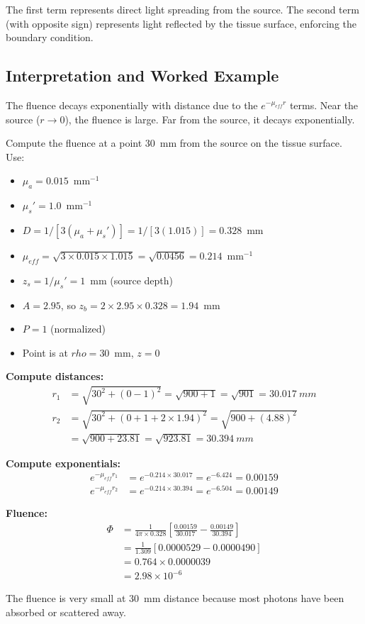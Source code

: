 \documentclass[12pt]{article}
\def\rho{rho}%
\def\mathrm#1{#1}%
\def\text#1{#1}%
\begin{document}
The first term represents direct light spreading from the source. The second term (with opposite sign) represents light reflected by the tissue surface, enforcing the boundary condition.

\subsection{Interpretation and Worked Example}

The fluence decays exponentially with distance due to the $e^{-\mu_{\mathrm{eff}} r}$ terms. Near the source ($r \to 0$), the fluence is large. Far from the source, it decays exponentially.

\begin{workexample}
Compute the fluence at a point 30~mm from the source on the tissue surface. Use:
\begin{itemize}
\item $\mu_a = 0.015$~mm$^{-1}$
\item $\mu_s' = 1.0$~mm$^{-1}$
\item $D = 1 / [3(\mu_a + \mu_s')] = 1 / [3(1.015)] = 0.328$~mm
\item $\mu_{\mathrm{eff}} = \sqrt{3 \times 0.015 \times 1.015} = \sqrt{0.0456} = 0.214$~mm$^{-1}$
\item $z_s = 1 / \mu_s' = 1$~mm (source depth)
\item $A = 2.95$, so $z_b = 2 \times 2.95 \times 0.328 = 1.94$~mm
\item $P = 1$ (normalized)
\item Point is at $\rho = 30$~mm, $z = 0$
\end{itemize}

\textbf{Compute distances:}
\begin{align}
r_1 &= \sqrt{30^2 + (0 - 1)^2} = \sqrt{900 + 1} = \sqrt{901} = 30.017~\text{mm} \\
r_2 &= \sqrt{30^2 + (0 + 1 + 2 \times 1.94)^2} = \sqrt{900 + (4.88)^2} \\
    &= \sqrt{900 + 23.81} = \sqrt{923.81} = 30.394~\text{mm}
\end{align}

\textbf{Compute exponentials:}
\begin{align}
e^{-\mu_{\mathrm{eff}} r_1} &= e^{-0.214 \times 30.017} = e^{-6.424} = 0.00159 \\
e^{-\mu_{\mathrm{eff}} r_2} &= e^{-0.214 \times 30.394} = e^{-6.504} = 0.00149
\end{align}

\textbf{Fluence:}
\begin{align}
\Phi &= \frac{1}{4\pi \times 0.328} \left[ \frac{0.00159}{30.017} - \frac{0.00149}{30.394} \right] \\
&= \frac{1}{1.309} \left[ 0.0000529 - 0.0000490 \right] \\
&= 0.764 \times 0.0000039 \\
&= 2.98 \times 10^{-6}
\end{align}

The fluence is very small at 30~mm distance because most photons have been absorbed or scattered away.
\end{workexample}
\end{document}
